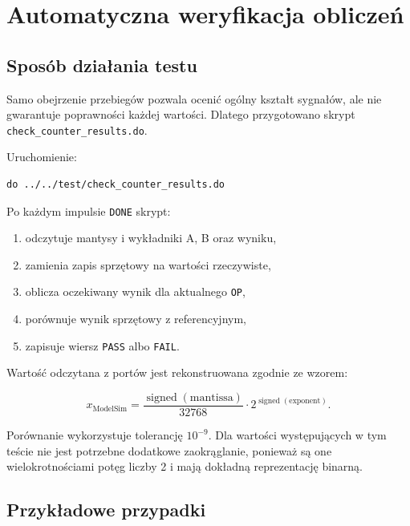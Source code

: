 \documentclass[12pt,a4paper]{article}
\begin{document}
\section{Automatyczna weryfikacja obliczeń}

\subsection{Sposób działania testu}

Samo obejrzenie przebiegów pozwala ocenić ogólny kształt sygnałów, ale nie
gwarantuje poprawności każdej wartości. Dlatego przygotowano skrypt
\texttt{check\_counter\_results.do}.

Uruchomienie:

\begin{lstlisting}[language=tcl,caption={Uruchomienie automatycznego testu}]
do ../../test/check_counter_results.do
\end{lstlisting}

Po każdym impulsie \texttt{DONE} skrypt:

\begin{enumerate}
    \item odczytuje mantysy i wykładniki A, B oraz wyniku,
    \item zamienia zapis sprzętowy na wartości rzeczywiste,
    \item oblicza oczekiwany wynik dla aktualnego \texttt{OP},
    \item porównuje wynik sprzętowy z referencyjnym,
    \item zapisuje wiersz \texttt{PASS} albo \texttt{FAIL}.
\end{enumerate}

Wartość odczytana z portów jest rekonstruowana zgodnie ze wzorem:

\begin{equation}
    x_{\text{ModelSim}} =
    \frac{\operatorname{signed}(\text{mantissa})}{32768}
    \cdot 2^{\operatorname{signed}(\text{exponent})}.
\end{equation}

Porównanie wykorzystuje tolerancję \(10^{-9}\). Dla wartości występujących
w tym teście nie jest potrzebne dodatkowe zaokrąglanie, ponieważ są one
wielokrotnościami potęg liczby 2 i mają dokładną reprezentację binarną.

\subsection{Przykładowe przypadki}
\end{document}
